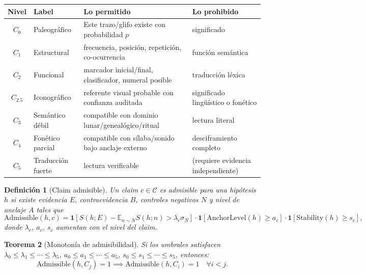 \documentclass[11pt,a4paper]{article}
\newtheorem{theorem}{Teorema}[section]
\newtheorem{definition}[theorem]{Definición}
\newcommand{\E}{\mathbb{E}}
\newcommand{\1}{\mathbf{1}}
\numberwithin{equation}{section}
\begin{document}
\begin{center}
\begin{tabular}{clp{5.5cm}p{4cm}}
\toprule
Nivel & Label & Lo permitido & Lo prohibido \\
\midrule
$C_0$ & Paleográfico & Este trazo/glifo existe con probabilidad $p$ & significado \\
$C_1$ & Estructural & frecuencia, posición, repetición, co-ocurrencia & función semántica \\
$C_2$ & Funcional & marcador inicial/final, clasificador, numeral posible & traducción léxica \\
$C_{2.5}$ & Iconográfico & referente visual probable con confianza auditada & significado lingüístico o fonético \\
$C_3$ & Semántico débil & compatible con dominio lunar/genealógico/ritual & lectura literal \\
$C_4$ & Fonético parcial & compatible con sílaba/sonido bajo anclaje externo & desciframiento completo \\
$C_5$ & Traducción fuerte & lectura verificable & (requiere evidencia independiente) \\
\bottomrule
\end{tabular}
\end{center}

\begin{definition}[Claim admisible]
\label{def:admissible}
Un claim $c\in\mathcal{C}$ es admisible para una hipótesis $h$ si existe evidencia $E$, contraevidencia $B$, controles negativos $N$ y nivel de anclaje $A$ tales que
\begin{equation}
    \mathrm{Admissible}(h,c)
    =
    \mathbf{1}\!\left[S(h;E)-\E_{n\sim N}S(h;n)>\lambda_c\sigma_N\right]
    \cdot
    \mathbf{1}\!\left[\mathrm{AnchorLevel}(h)\geq a_c\right]
    \cdot
    \mathbf{1}\!\left[\mathrm{Stability}(h)\geq s_c\right],
\end{equation}
donde $\lambda_c$, $a_c$, $s_c$ aumentan con el nivel del claim.
\end{definition}

\begin{theorem}[Monotonía de admisibilidad]
Si los umbrales satisfacen $\lambda_0\leq\lambda_1\leq\cdots\leq\lambda_5$, $a_0\leq a_1\leq\cdots\leq a_5$, $s_0\leq s_1\leq\cdots\leq s_5$, entonces:
\begin{equation}
    \mathrm{Admissible}(h,C_j)=1 \implies \mathrm{Admissible}(h,C_i)=1
    \quad\forall i<j.
\end{equation}
\end{theorem}
\end{document}
